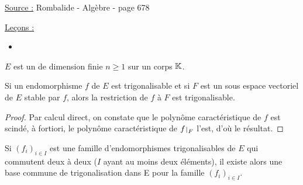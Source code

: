 

\pagestyle{fancy}

\fancyhead[R]{}



\underline{Source :} Rombalide - Algèbre - page 678

\underline{Leçons :}
\begin{itemize}
\item 
\end{itemize}

\begin{nota}
$E$ est un \Kev de dimension finie $n \geq 1$ sur un corps $\mathbb{K}$.
\end{nota}

\begin{lem}
Si un endomorphisme $f$ de $E$ est trigonalisable et si $F$ est un sous espace vectoriel de $E$ stable par $f$, 
alors la restriction de $f$ à $F$ est trigonalisable.
\end{lem}

\begin{proof}
Par calcul direct, on constate que le polynôme caractéristique de $f$ est scindé, à fortiori, le polynôme caractéristique de $\restr{f}{F}$
l'est, d'où le résultat.
\end{proof}

\begin{thm}
Si $(f_i)_{i \in I}$ est une famille d’endomorphismes trigonalisables de $E$ qui
commutent deux à deux ($I$ ayant au moins deux éléments), il existe alors
une base commune de trigonalisation dans E pour la famille $(f_i)_{i \in I}$.
\end{thm}

